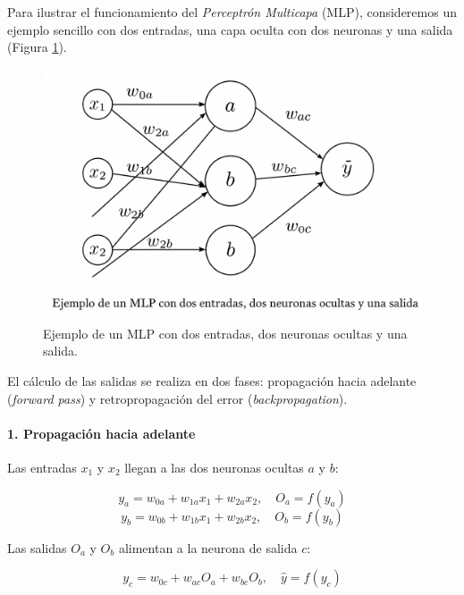Para ilustrar el funcionamiento del \textit{Perceptrón Multicapa} (MLP), consideremos un ejemplo sencillo con dos entradas, una capa oculta con dos neuronas y una salida (Figura \ref{fig:mlp_ejemplo}).  

\begin{figure}[H]
    \centering
    \includegraphics[scale=0.2]{figuras/mlp.png}
    \caption{Ejemplo de un MLP con dos entradas, dos neuronas ocultas y una salida.}
    \label{fig:mlp_ejemplo}
\end{figure}





El cálculo de las salidas se realiza en dos fases: propagación hacia adelante (\textit{forward pass}) y retropropagación del error (\textit{backpropagation}).

\paragraph{1. Propagación hacia adelante}
Las entradas $x_1$ y $x_2$ llegan a las dos neuronas ocultas $a$ y $b$:

\begin{equation}
    y_{a} = w_{0a} + w_{1a}x_{1} + w_{2a}x_{2}, \quad O_{a} = f(y_{a})
\end{equation}
\begin{equation}
    y_{b} = w_{0b} + w_{1b}x_{1} + w_{2b}x_{2}, \quad O_{b} = f(y_{b})
\end{equation}

Las salidas $O_{a}$ y $O_{b}$ alimentan a la neurona de salida $c$:

\begin{equation}
    y_{c} = w_{0c} + w_{ac}O_{a} + w_{bc}O_{b}, \quad \hat{y} = f(y_{c})
\end{equation}

